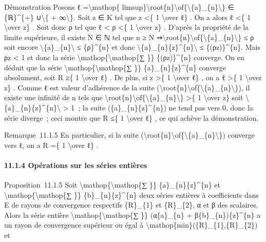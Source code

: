 \documentclass[]{article}
\begin{document}
Démonstration Posons ℓ =\textbackslash{}mathop\{
limsup\}\textbackslash{}root\{n\}\textbackslash{}of\{\textbackslash{}\textbar{}\{a\}\_\{n\}\textbackslash{}\textbar{}\}
∈ \{ℝ\}\^{}\{+\} ∪\textbackslash{}\{ + ∞\textbackslash{}\}. Soit z ∈ K
tel que \textbar{}z\textbar{} \textless{}\{ 1 \textbackslash{}over ℓ\} .
On a alors ℓ \textless{}\{ 1 \textbackslash{}over
\textbar{}z\textbar{}\} . Soit donc ρ tel que ℓ \textless{} ρ
\textless{}\{ 1 \textbackslash{}over \textbar{}z\textbar{}\} . D'après
la propriété de la limite supérieure, il existe N ∈ ℕ tel que n ≥ N
⇒\textbackslash{}root\{n\}\textbackslash{}of\{\textbackslash{}\textbar{}\{a\}\_\{n\}\textbackslash{}\textbar{}\}
≤ ρ soit encore
\textbackslash{}\textbar{}\{a\}\_\{n\}\textbackslash{}\textbar{} ≤
\{ρ\}\^{}\{n\} et donc
\textbackslash{}\textbar{}\{a\}\_\{n\}\{z\}\^{}\{n\}\textbackslash{}\textbar{}
≤ \{(ρ\textbar{}z\textbar{})\}\^{}\{n\}. Mais ρ\textbar{}z\textbar{}
\textless{} 1 et donc la série
\textbackslash{}mathop\{\textbackslash{}mathop\{∑ \}\}
\{(ρ\textbar{}z\textbar{})\}\^{}\{n\} converge. On en déduit que la
série \textbackslash{}mathop\{\textbackslash{}mathop\{∑ \}\}
\{a\}\_\{n\}\{z\}\^{}\{n\} converge absolument, soit R ≥\{ 1
\textbackslash{}over ℓ\} . De plus, si \textbar{}z\textbar{}
\textgreater{}\{ 1 \textbackslash{}over ℓ\} , on a ℓ \textgreater{}\{ 1
\textbackslash{}over \textbar{}z\textbar{}\} . Comme ℓ est valeur
d'adhérence de la suite
(\textbackslash{}root\{n\}\textbackslash{}of\{\textbackslash{}\textbar{}\{a\}\_\{n\}\textbackslash{}\textbar{}\}),
il existe une infinité de n tels que
\textbackslash{}root\{n\}\textbackslash{}of\{\textbackslash{}\textbar{}\{a\}\_\{n\}\textbackslash{}\textbar{}\}
\textgreater{}\{ 1 \textbackslash{}over \textbar{}z\textbar{}\} soit
\textbackslash{}\textbar{}\{a\}\_\{n\}\{z\}\^{}\{n\}\textbackslash{}\textbar{}
\textgreater{} 1~; la suite (\{a\}\_\{n\}\{z\}\^{}\{n\}) ne tend pas
vers 0, donc la série diverge~; ceci montre que R ≤\{ 1
\textbackslash{}over ℓ\} , ce qui achève la démonstration.

Remarque~11.1.5 En particulier, si la suite
(\textbackslash{}root\{n\}\textbackslash{}of\{\textbackslash{}\textbar{}\{a\}\_\{n\}\textbackslash{}\textbar{}\})
converge vers ℓ, on a R =\{ 1 \textbackslash{}over ℓ\} .

\paragraph{11.1.4 Opérations sur les séries entières}

Proposition~11.1.5 Soit
\textbackslash{}mathop\{\textbackslash{}mathop\{∑ \}\}
\{a\}\_\{n\}\{z\}\^{}\{n\} et
\textbackslash{}mathop\{\textbackslash{}mathop\{∑ \}\}
\{b\}\_\{n\}\{z\}\^{}\{n\} deux séries entières à coefficients dans E de
rayons de convergence respectifs \{R\}\_\{1\} et \{R\}\_\{2\}, α et β
des scalaires. Alors la série entière
\textbackslash{}mathop\{\textbackslash{}mathop\{∑ \}\} (α\{a\}\_\{n\} +
β\{b\}\_\{n\})\{z\}\^{}\{n\} a un rayon de convergence supérieur ou égal
à \textbackslash{}mathop\{min\}(\{R\}\_\{1\},\{R\}\_\{2\}) et
\end{document}
